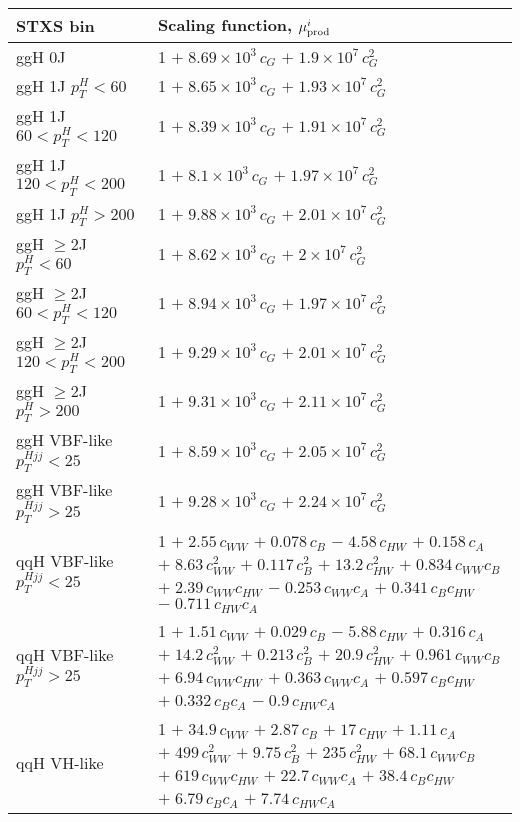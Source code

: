 \begin{tabular}{l|p{}}
    \hline
    STXS bin & Scaling function, $\mu^i_{\rm{prod}}$ \\ \hline
    ggH 0J & 1 $+\;8.69\times 10^{3}\,c_{G}$ $+\;1.9\times 10^{7}\,c_{G}^{2}$ \\
    ggH 1J $p_{T}^{H} < 60$ & 1 $+\;8.65\times 10^{3}\,c_{G}$ $+\;1.93\times 10^{7}\,c_{G}^{2}$ \\
    ggH 1J $60 < p_{T}^{H} < 120$ & 1 $+\;8.39\times 10^{3}\,c_{G}$ $+\;1.91\times 10^{7}\,c_{G}^{2}$ \\
    ggH 1J $120 < p_{T}^{H} < 200$ & 1 $+\;8.1\times 10^{3}\,c_{G}$ $+\;1.97\times 10^{7}\,c_{G}^{2}$ \\
    ggH 1J $p_{T}^{H} > 200$ & 1 $+\;9.88\times 10^{3}\,c_{G}$ $+\;2.01\times 10^{7}\,c_{G}^{2}$ \\
    ggH $\geq$2J $p_{T}^{H} < 60$ & 1 $+\;8.62\times 10^{3}\,c_{G}$ $+\;2\times 10^{7}\,c_{G}^{2}$ \\
    ggH $\geq$2J $60 < p_{T}^{H} < 120$ & 1 $+\;8.94\times 10^{3}\,c_{G}$ $+\;1.97\times 10^{7}\,c_{G}^{2}$ \\
    ggH $\geq$2J $120 < p_{T}^{H} < 200$ & 1 $+\;9.29\times 10^{3}\,c_{G}$ $+\;2.01\times 10^{7}\,c_{G}^{2}$ \\
    ggH $\geq$2J $p_{T}^{H} > 200$ & 1 $+\;9.31\times 10^{3}\,c_{G}$ $+\;2.11\times 10^{7}\,c_{G}^{2}$ \\
    ggH VBF-like $p_T^{Hjj}<25$ & 1 $+\;8.59\times 10^{3}\,c_{G}$ $+\;2.05\times 10^{7}\,c_{G}^{2}$ \\
    ggH VBF-like $p_T^{Hjj}>25$ & 1 $+\;9.28\times 10^{3}\,c_{G}$ $+\;2.24\times 10^{7}\,c_{G}^{2}$ \\
    \hline
    qqH VBF-like $p_T^{Hjj}<25$ & 1 $+\;2.55\,c_{WW}$ $+\;0.078\,c_{B}$ $-\;4.58\,c_{HW}$ $+\;0.158\,c_{A}$ $+\;8.63\,c_{WW}^{2}$ $+\;0.117\,c_{B}^{2}$ $+\;13.2\,c_{HW}^{2}$ $+\;0.834\,c_{WW}c_{B}$ $+\;2.39\,c_{WW}c_{HW}$ $-\;0.253\,c_{WW}c_{A}$ $+\;0.341\,c_{B}c_{HW}$ $-\;0.711\,c_{HW}c_{A}$ \\
    qqH VBF-like $p_T^{Hjj}>25$ & 1 $+\;1.51\,c_{WW}$ $+\;0.029\,c_{B}$ $-\;5.88\,c_{HW}$ $+\;0.316\,c_{A}$ $+\;14.2\,c_{WW}^{2}$ $+\;0.213\,c_{B}^{2}$ $+\;20.9\,c_{HW}^{2}$ $+\;0.961\,c_{WW}c_{B}$ $+\;6.94\,c_{WW}c_{HW}$ $+\;0.363\,c_{WW}c_{A}$ $+\;0.597\,c_{B}c_{HW}$ $+\;0.332\,c_{B}c_{A}$ $-\;0.9\,c_{HW}c_{A}$ \\
    qqH VH-like & 1 $+\;34.9\,c_{WW}$ $+\;2.87\,c_{B}$ $+\;17\,c_{HW}$ $+\;1.11\,c_{A}$ $+\;499\,c_{WW}^{2}$ $+\;9.75\,c_{B}^{2}$ $+\;235\,c_{HW}^{2}$ $+\;68.1\,c_{WW}c_{B}$ $+\;619\,c_{WW}c_{HW}$ $+\;22.7\,c_{WW}c_{A}$ $+\;38.4\,c_{B}c_{HW}$ $+\;6.79\,c_{B}c_{A}$ $+\;7.74\,c_{HW}c_{A}$ \\

\end{tabular}
